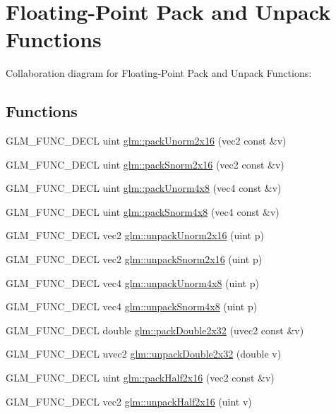 \hypertarget{group__core__func__packing}{\section{Floating-\/\-Point Pack and Unpack Functions}
\label{group__core__func__packing}
}
Collaboration diagram for Floating-\/\-Point Pack and Unpack Functions\-:
\subsection*{Functions}
\begin{DoxyCompactItemize}
\item 
G\-L\-M\-\_\-\-F\-U\-N\-C\-\_\-\-D\-E\-C\-L uint \hyperlink{group__core__func__packing_ga0659ddaf09727551c7bf51655d2a65cf}{glm\-::pack\-Unorm2x16} (vec2 const \&v)
\item 
G\-L\-M\-\_\-\-F\-U\-N\-C\-\_\-\-D\-E\-C\-L uint \hyperlink{group__core__func__packing_ga0c8005de240d6c4ca3d16c7bee25c622}{glm\-::pack\-Snorm2x16} (vec2 const \&v)
\item 
G\-L\-M\-\_\-\-F\-U\-N\-C\-\_\-\-D\-E\-C\-L uint \hyperlink{group__core__func__packing_ga834ee9a9e73dcb0a7c1fc88143f3edb8}{glm\-::pack\-Unorm4x8} (vec4 const \&v)
\item 
G\-L\-M\-\_\-\-F\-U\-N\-C\-\_\-\-D\-E\-C\-L uint \hyperlink{group__core__func__packing_gafcf25acc0d361c6c696a433aa5dfd16b}{glm\-::pack\-Snorm4x8} (vec4 const \&v)
\item 
G\-L\-M\-\_\-\-F\-U\-N\-C\-\_\-\-D\-E\-C\-L vec2 \hyperlink{group__core__func__packing_ga11776a74e1885a14e1295d6e917a9ae2}{glm\-::unpack\-Unorm2x16} (uint p)
\item 
G\-L\-M\-\_\-\-F\-U\-N\-C\-\_\-\-D\-E\-C\-L vec2 \hyperlink{group__core__func__packing_gae5f30f599243df9525315edecae09a7f}{glm\-::unpack\-Snorm2x16} (uint p)
\item 
G\-L\-M\-\_\-\-F\-U\-N\-C\-\_\-\-D\-E\-C\-L vec4 \hyperlink{group__core__func__packing_ga1ec646af4b27982d175672bddd642792}{glm\-::unpack\-Unorm4x8} (uint p)
\item 
G\-L\-M\-\_\-\-F\-U\-N\-C\-\_\-\-D\-E\-C\-L vec4 \hyperlink{group__core__func__packing_ga4b18a0480e7260401d97f40cacd6bc36}{glm\-::unpack\-Snorm4x8} (uint p)
\item 
G\-L\-M\-\_\-\-F\-U\-N\-C\-\_\-\-D\-E\-C\-L double \hyperlink{group__core__func__packing_gaf728fdfb98ce34da6f968d9f6bf154d7}{glm\-::pack\-Double2x32} (uvec2 const \&v)
\item 
G\-L\-M\-\_\-\-F\-U\-N\-C\-\_\-\-D\-E\-C\-L uvec2 \hyperlink{group__core__func__packing_gaea67aa4d065175e7746b2a8a2d00cedb}{glm\-::unpack\-Double2x32} (double v)
\item 
G\-L\-M\-\_\-\-F\-U\-N\-C\-\_\-\-D\-E\-C\-L uint \hyperlink{group__core__func__packing_ga082f6dd65f73a547ed3067ef00be036f}{glm\-::pack\-Half2x16} (vec2 const \&v)
\item 
G\-L\-M\-\_\-\-F\-U\-N\-C\-\_\-\-D\-E\-C\-L vec2 \hyperlink{group__core__func__packing_ga90be544929ed83fa7039208bbab8c0ba}{glm\-::unpack\-Half2x16} (uint v)
\end{DoxyCompactItemize}


